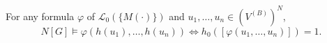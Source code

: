 For any formula $\varphi$ of $\mathcal{L}_0(\{M(\cdot)\})$ and $u_1, \ldots, u_n \in (V^{(B)})^N$,
$$N[G] \models \varphi(h(u_1), \ldots, h(u_n)) \iff h_0([\varphi(u_1, \ldots, u_n)]) = 1.$$
